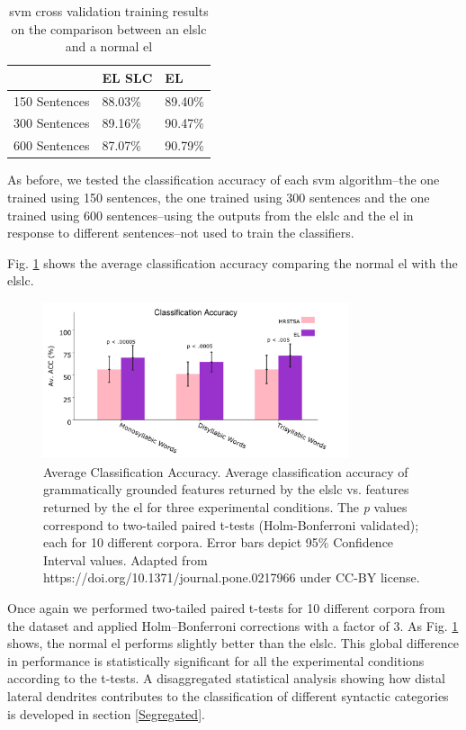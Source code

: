 {\begin{table}[ht!]
\centering
\caption{\gls{svm} cross validation training results on the comparison between an \gls{elslc} and a normal \gls{el}}
\begin{tabular}{|l|l|l|}
\hline
                & EL SLC  & EL \\ \hline
150 Sentences   & 88.03\%   & 89.40\%       \\ \hline
300 Sentences   & 89.16\%   & 90.47\%       \\ \hline
600 Sentences   & 87.07\%   & 90.79\%       \\ \hline
\end{tabular}
\label{SVM_Training1}
\end{table}


As before, we tested the classification accuracy of each \gls{svm} algorithm--the one trained using 150 sentences, the one trained using 300 sentences and the one trained using 600 sentences--using the outputs from the \gls{elslc} and the \gls{el} in response to different sentences--not used to train the classifiers.

Fig. \ref{fig:PLOT1} shows the average classification accuracy comparing the normal \gls{el} with the \gls{elslc}.


\begin{figure}[ht!]
    \centering
    \includegraphics[width=0.8\textwidth]{PLOT1.png}
    \caption{Average Classification Accuracy. Average classification accuracy of grammatically grounded features returned by the \gls{elslc} vs. features returned by the \gls{el} for three experimental conditions. The \emph{p} values correspond to two-tailed paired t-tests (Holm-Bonferroni validated); each for 10 different corpora. Error bars depict 95\% Confidence Interval values. Adapted from https://doi.org/10.1371/journal.pone.0217966 under CC-BY license.}
    \label{fig:PLOT1}
\end{figure}

Once again we performed two-tailed paired t-tests for 10 different corpora from the dataset and applied Holm–Bonferroni corrections with a factor of 3.
As Fig. \ref{fig:PLOT1} shows, the normal \gls{el} performs slightly better than the \gls{elslc}. This global difference in performance is statistically significant for all the experimental conditions according to the t-tests.
A disaggregated statistical analysis showing how distal lateral dendrites contributes to the classification of different syntactic categories is developed in section \ref{Segregated}.
}
